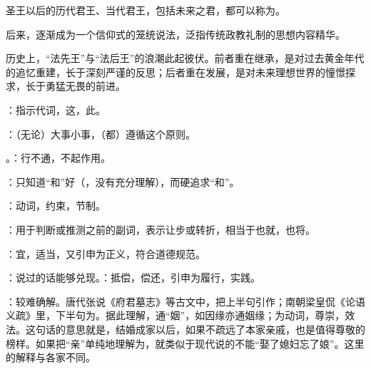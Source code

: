 {圣王以后的历代君王、当代君王，包括未来之君，都可以称为。

后来，逐渐成为一个信仰式的笼统说法，泛指传统政教礼制的思想内容精华。

历史上，“法先王”与“法后王”的浪潮此起彼伏。前者重在继承，是对过去黄金年代的追忆重建，长于深刻严谨的反思；后者重在发展，是对未来理想世界的憧憬探求，长于勇猛无畏的前进。

\item {}：指示代词，这，此。
\item {}：（无论）大事小事，（都）遵循这个原则。
\item {}。：行不通，不起作用。

：只知道“和”好（，没有充分理解），而硬追求“和”。

：动词，约束，节制。

：用于判断或推测之前的副词，表示让步或转折，相当于也就，也将。
}
{}


{
\item {}：宜，适当，又引申为正义，符合道德规范。
\item {}：说过的话能够兑现。：抵偿，偿还，引申为履行，实践。

\item {}：较难确解。唐代张说《府君墓志》等古文中，把上半句引作；南朝梁皇侃《论语义疏》里，下半句为。据此理解，通“姻”，如因缘亦通姻缘；为动词，尊崇，效法。这句话的意思就是，结婚成家以后，如果不疏远了本家亲戚，也是值得尊敬的榜样。如果把“亲”单纯地理解为，就类似于现代说的不能“娶了媳妇忘了娘”。这里的解释与各家不同。
}
{}


